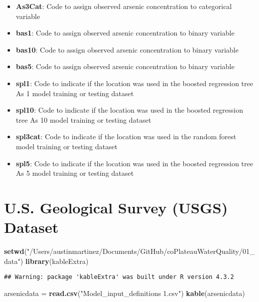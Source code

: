 \documentclass[
]{article}
\newenvironment{Shaded}{\begin{snugshade}}{\end{snugshade}}
\newcommand{\FunctionTok}[1]{\textcolor[rgb]{0.13,0.29,0.53}{\textbf{#1}}}
\newcommand{\NormalTok}[1]{#1}
\newcommand{\OtherTok}[1]{\textcolor[rgb]{0.56,0.35,0.01}{#1}}
\newcommand{\StringTok}[1]{\textcolor[rgb]{0.31,0.60,0.02}{#1}}
\providecommand{\tightlist}{%
  \setlength{\itemsep}{0pt}\setlength{\parskip}{0pt}}
\begin{document}
\begin{itemize}
\tightlist
\item
  \textbf{As3Cat}: Code to assign observed arsenic concentration to
  categorical variable
\item
  \textbf{bas1}: Code to assign observed arsenic concentration to binary
  variable
\item
  \textbf{bas10}: Code to assign observed arsenic concentration to
  binary variable
\item
  \textbf{bas5}: Code to assign observed arsenic concentration to binary
  variable
\item
  \textbf{spl1}: Code to indicate if the location was used in the
  boosted regression tree As 1 model training or testing dataset
\item
  \textbf{spl10}: Code to indicate if the location was used in the
  boosted regression tree As 10 model training or testing dataset
\item
  \textbf{spl3cat}: Code to indicate if the location was used in the
  random forest model training or testing dataset
\item
  \textbf{spl5}: Code to indicate if the location was used in the
  boosted regression tree As 5 model training or testing dataset
\end{itemize}

\hypertarget{u.s.-geological-survey-usgs-dataset}{%
\section{U.S. Geological Survey (USGS)
Dataset}\label{u.s.-geological-survey-usgs-dataset}}

\begin{Shaded}
\begin{Highlighting}[]
\FunctionTok{setwd}\NormalTok{(}\StringTok{"/Users/austinmartinez/Documents/GitHub/coPlateauWaterQuality/01\_data"}\NormalTok{)}
\FunctionTok{library}\NormalTok{(kableExtra)}
\end{Highlighting}
\end{Shaded}

\begin{verbatim}
## Warning: package 'kableExtra' was built under R version 4.3.2
\end{verbatim}

\begin{Shaded}
\begin{Highlighting}[]
\NormalTok{arsenicdata }\OtherTok{=} \FunctionTok{read.csv}\NormalTok{(}\StringTok{"Model\_input\_definitions 1.csv"}\NormalTok{)}
\FunctionTok{kable}\NormalTok{(arsenicdata)}
\end{Highlighting}
\end{Shaded}
\end{document}
